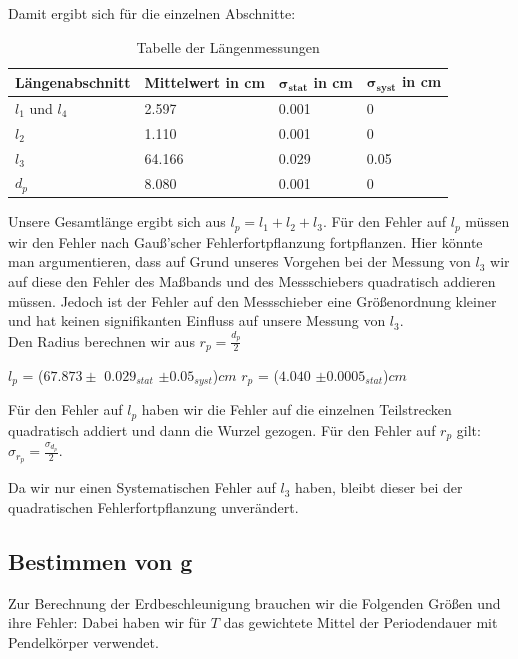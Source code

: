 \documentclass[twoside]{protokoll}
\begin{document}
Damit ergibt sich für die einzelnen Abschnitte:

\begin{table}[H]
        \centering
        \begin{tabularx}{1.0\textwidth}{X X X X} %
            \toprule
            \textbf{Längenabschnitt} & \textbf{Mittelwert in cm} & $\mathbf{\sigma_{stat}}$ in cm & $\mathbf{\sigma_{syst}}$ in cm\\
            \midrule
            $l_1$ und $l_4$ & 2.597 & 0.001 & 0 \\
            $l_2$ & 1.110 & 0.001 & 0\\
            $l_3$ & 64.166 & 0.029 & 0.05\\
            $d_p$ & 8.080 & 0.001 & 0\\
            \bottomrule
        \end{tabularx}
        \caption{Tabelle der Längenmessungen}
        \label{tab:längen un fehler}
    \end{table}

Unsere Gesamtlänge ergibt sich aus $l_p = l_1 + l_2 + l_3$. Für den Fehler auf $l_p$ müssen wir den Fehler nach Gauß'scher Fehlerfortpflanzung fortpflanzen. 
Hier könnte man argumentieren, dass auf Grund unseres Vorgehen bei der Messung von $l_3$ wir auf diese den Fehler des Maßbands und des Messschiebers quadratisch addieren müssen.
Jedoch ist der Fehler auf den Messschieber eine Größenordnung kleiner und hat keinen signifikanten Einfluss auf unsere Messung von $l_3$.\\
Den Radius berechnen wir aus $r_p = \frac{d_p}{2}$
\begin{center}
$l_p$ = ($67.873 \pm$ $0.029_{stat}$ $\pm 0.05_{syst}$)$cm$   \qquad $r_p$ = ($4.040$ $\pm 0.0005_{stat}$)$cm$
\end{center}

Für den Fehler auf $l_p$ haben wir die Fehler auf die einzelnen Teilstrecken quadratisch addiert und dann die Wurzel gezogen.
Für den Fehler auf $r_p$  gilt: $\sigma_{r_p} =\frac{\sigma_{d_p}}{2}$.

Da wir nur einen Systematischen Fehler auf $l_3$ haben, bleibt dieser bei der quadratischen Fehlerfortpflanzung unverändert.

\subsection{Bestimmen von g}

Zur Berechnung der Erdbeschleunigung brauchen wir die Folgenden Größen und ihre Fehler:
Dabei haben wir für $T$ das gewichtete Mittel der Periodendauer mit Pendelkörper verwendet.
 
\end{document}
